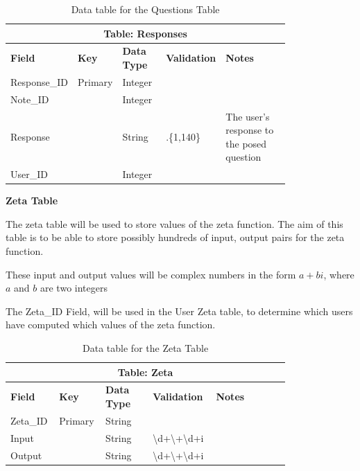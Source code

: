 \documentclass[12pt]{article}
\begin{document}
\begin{table}[ht]
    \centering
    \begin{tabular}{ | p{0.15\linewidth} | p{0.1\linewidth} | p{0.16\linewidth} | p{0.14\linewidth} | p{0.25\linewidth} | }
    \hline
    \multicolumn{5}{|c|}{\textbf{Table: Responses}}\\
    \hline
    \hline
    \textbf{Field} & \textbf{Key} & \textbf{Data Type} & \textbf{Validation} & \textbf{Notes} \\
    \hline
    Response\_ID & Primary & Integer & & \\
    \hline
    Note\_ID & & Integer & & \\
    \hline
    Response & & String & .\{1,140\} & The user's response to the posed question\\
    \hline
    User\_ID & & Integer & & \\
    \hline
    \end{tabular}
    \caption{Data table for the Questions Table}
\end{table}

\clearpage
\textbf{Zeta Table}

The zeta table will be used to store values of the zeta function. The aim of this table is to be able to store possibly hundreds of input, output pairs for the zeta function.

These input and output values will be complex numbers in the form $a+bi$, where $a$ and $b$ are two integers

The Zeta\_ID Field, will be used in the User Zeta table, to determine which users have computed which values of the zeta function.


\begin{table}[ht]
    \centering
    \begin{tabular}{ | p{0.12\linewidth} | p{0.1\linewidth} | p{0.16\linewidth} | p{0.17\linewidth} | p{0.25\linewidth} | }
    \hline
    \multicolumn{5}{|c|}{\textbf{Table: Zeta}}\\
    \hline
    \hline
    \textbf{Field} & \textbf{Key} & \textbf{Data Type} & \textbf{Validation} & \textbf{Notes} \\
    \hline
    Zeta\_ID & Primary & String & & \\
    \hline
    Input & & String & \textbackslash d+\textbackslash +\textbackslash d+i & \\
    \hline
    Output & & String & \textbackslash d+\textbackslash +\textbackslash d+i & \\
    \hline
    \end{tabular}
    \caption{Data table for the Zeta Table}
\end{table}
\end{document}
